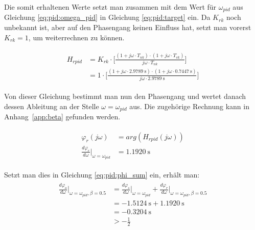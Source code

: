 Die   somit   erhaltenen    Werte   setzt   man   zusammen    mit   dem   Wert
f\"ur  $\omega_{pid}$   aus  Gleichung  \ref{eq:pid:omega_pid}   in  Gleichung
\ref{eq:pid:target}  ein.   Da  $K_{rk}$  noch unbekannt  ist,  aber  auf  den
Phasengang  keinen  Einfluss   hat,  setzt  man  vorerst  $K_{rk}   =  1$,  um
weiterrechnen zu k\"onnen.

\begin{gather} \label{eq:pid:t_nk_t_vk_initial_results}
    \begin{split}
        H_{rpid} & = K_{rk} \cdot \biggl[ \frac{(1 + j\omega \cdot T_{nk}) \cdot (1 + j\omega \cdot T_{vk}) }{ j\omega \cdot T_{nk} } \biggr] \\
                 & = 1      \cdot \biggl[ \frac{(1 + j\omega \cdot \SI{2.9789}{\second}) \cdot (1 + j\omega \cdot \SI{0.7447}{\second}) }{ j\omega \cdot  \SI{2.9789}{\second}} \biggr]
    \end{split}
\end{gather}

Von dieser Gleichung bestimmt man nun  den Phasengang und wertet danach dessen
Ableitung an der Stelle $\omega = \omega_{pid}$ aus. Die zugeh\"orige Rechnung
kann in Anhang~\ref{app:beta} gefunden werden.

\begin{gather} \label{eq:pid:phi_r_first_iteration}
    \begin{split}
        \varphi_r (j\omega)                                            & = arg(H_{rpid}(j\omega))        \\
        \frac{d\varphi_r}{d\omega} \biggr \rvert_{\omega=\omega_{pid}} & = \SI{1.1920}{\second}
    \end{split}
\end{gather}


Setzt man dies in Gleichung \ref{eq:pid:phi_sum} ein, erh\"alt man:
\begin{gather} \label{eq:pid:phi_sum_result_iteration_one}
    \begin{split}
    \frac{d\varphi_o}{d\omega}       \biggr \rvert_{\omega=\omega_{pid}, \beta=0.5}
        & = \frac{d\varphi_s}{d\omega} \biggr \rvert_{\omega=\omega_{pid}}
        + \frac{d\varphi_r}{d\omega} \biggr \rvert_{\omega=\omega_{pid}, \beta=0.5} \\
        & = \SI{-1.5124}{\second} + \SI{1.1920}{\second} \\
        & = \SI{-0.3204}{\second} \\
        & > -\frac{1}{2}
    \end{split}
\end{gather}

